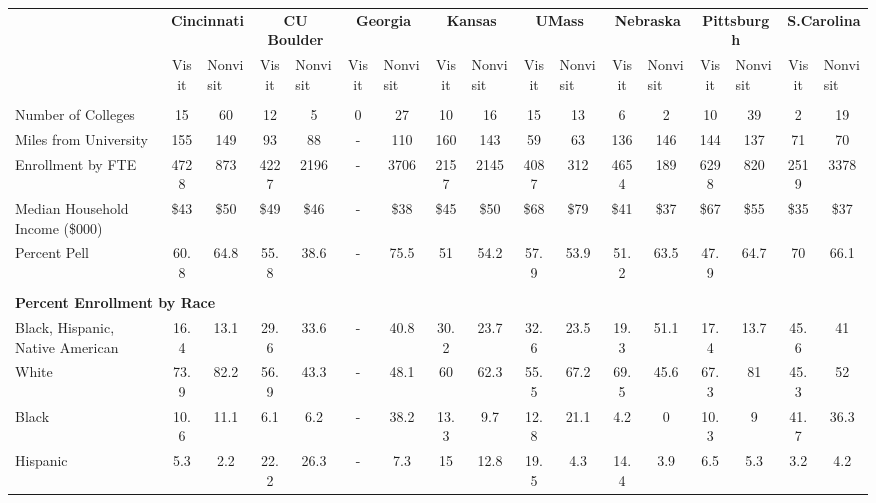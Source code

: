 \begin{tabular*}{\linewidth}{@{\extracolsep{\fill} } lcccccccccccccccc}%
&\multicolumn{2}{c}{\bfseries Cincinnati}&\multicolumn{2}{c}{\bfseries CU Boulder}&\multicolumn{2}{c}{\bfseries Georgia}&\multicolumn{2}{c}{\bfseries Kansas}&\multicolumn{2}{c}{\bfseries UMass}&\multicolumn{2}{c}{\bfseries Nebraska}&\multicolumn{2}{c}{\bfseries Pittsburgh}&\multicolumn{2}{c}{\bfseries S.Carolina}\\%
&Visit&\multicolumn{1}{l}{Nonvisit}&Visit&\multicolumn{1}{l}{Nonvisit}&Visit&\multicolumn{1}{l}{Nonvisit}&Visit&\multicolumn{1}{l}{Nonvisit}&Visit&\multicolumn{1}{l}{Nonvisit}&Visit&\multicolumn{1}{l}{Nonvisit}&Visit&\multicolumn{1}{l}{Nonvisit}&Visit&\multicolumn{1}{l}{Nonvisit}\\%
\hline%
&&&&&&&&&&&&&&&&\\%
\hspace{0cm}Number of Colleges&15&60&12&5&0&27&10&16&15&13&6&2&10&39&2&19\\%
\hspace{0cm}Miles from University&155&149&93&88&{-}&110&160&143&59&63&136&146&144&137&71&70\\%
\hspace{0cm}Enrollment by FTE&4728&873&4227&2196&{-}&3706&2157&2145&4087&312&4654&189&6298&820&2519&3378\\%
\hspace{0cm}Median Household Income (\$000)&\$43&\$50&\$49&\$46&{-}&\$38&\$45&\$50&\$68&\$79&\$41&\$37&\$67&\$55&\$35&\$37\\%
\hspace{0cm}Percent Pell&60.8&64.8&55.8&38.6&{-}&75.5&51&54.2&57.9&53.9&51.2&63.5&47.9&64.7&70&66.1\\%
&&&&&&&&&&&&&&&&\\%
\multicolumn{17}{l}{\bfseries Percent Enrollment by Race}\\%
\hspace{0.2cm}Black, Hispanic, Native American&16.4&13.1&29.6&33.6&{-}&40.8&30.2&23.7&32.6&23.5&19.3&51.1&17.4&13.7&45.6&41\\%
\hspace{0.2cm}White&73.9&82.2&56.9&43.3&{-}&48.1&60&62.3&55.5&67.2&69.5&45.6&67.3&81&45.3&52\\%
\hspace{0.2cm}Black&10.6&11.1&6.1&6.2&{-}&38.2&13.3&9.7&12.8&21.1&4.2&0&10.3&9&41.7&36.3\\%
\hspace{0.2cm}Hispanic&5.3&2.2&22.2&26.3&{-}&7.3&15&12.8&19.5&4.3&14.4&3.9&6.5&5.3&3.2&4.2\\%

\end{tabular*}

